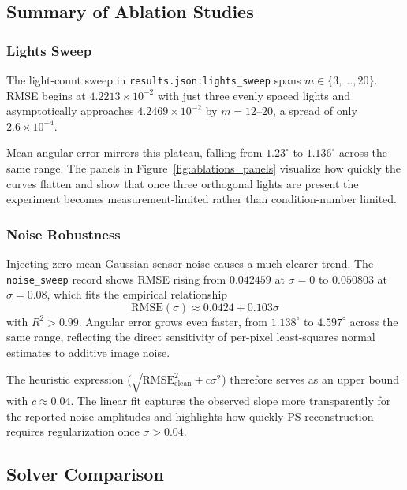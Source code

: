 \documentclass[11pt]{article}
\begin{document}
\subsection{Summary of Ablation Studies}

\subsubsection{Lights Sweep}

The light-count sweep in \texttt{results.json:lights\_sweep} spans $m\in\{3,\dots,20\}$. RMSE begins at $4.2213\times10^{-2}$ with just three evenly spaced lights and asymptotically approaches $4.2469\times10^{-2}$ by $m=12$--$20$, a spread of only $2.6\times10^{-4}$.

Mean angular error mirrors this plateau, falling from $1.23^{\circ}$ to $1.136^{\circ}$ across the same range. The panels in Figure~\ref{fig:ablations_panels} visualize how quickly the curves flatten and show that once three orthogonal lights are present the experiment becomes measurement-limited rather than condition-number limited.

\subsubsection{Noise Robustness}

Injecting zero-mean Gaussian sensor noise causes a much clearer trend. The \texttt{noise\_sweep} record shows RMSE rising from $0.042459$ at $\sigma=0$ to $0.050803$ at $\sigma=0.08$, which fits the empirical relationship
\begin{equation}
\text{RMSE}(\sigma) \approx 0.0424 + 0.103\sigma
\end{equation}
with $R^2>0.99$. Angular error grows even faster, from $1.138^{\circ}$ to $4.597^{\circ}$ across the same range, reflecting the direct sensitivity of per-pixel least-squares normal estimates to additive image noise.

The heuristic expression ($\sqrt{\text{RMSE}_{\text{clean}}^2 + c\sigma^2}$) therefore serves as an upper bound with $c\approx0.04$. The linear fit captures the observed slope more transparently for the reported noise amplitudes and highlights how quickly PS reconstruction requires regularization once $\sigma>0.04$.

\subsection{Solver Comparison}
\end{document}
